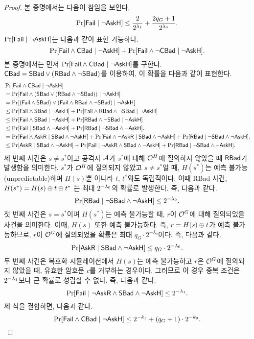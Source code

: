 \begin{proof}
	본 증명에서는 다음이 참임을 보인다.
	$$
		\Pr[\textsf{Fail} \mid \neg\textsf{AskH}] \le  \frac{2}{2^{\lambda_1}} + \frac{2q_{G} + 1}{2^{\lambda_0}}.
	$$
	$\Pr[\textsf{Fail} \mid \neg\textsf{AskH}]$는 다음과 같이 표현 가능하다.
	$$
		\Pr[\textsf{Fail} \land \textsf{CBad} \mid \neg\textsf{AskH}]
		+ \Pr[\textsf{Fail} \land \neg\textsf{CBad} \mid \neg\textsf{AskH}].
	$$
	본 증명에서는 먼저 $\Pr[\textsf{Fail} \land \textsf{CBad} \mid \neg\textsf{AskH}]$를 구한다. $\textsf{CBad}
	= \textsf{SBad} \lor (\textsf{RBad} \land \neg\textsf{SBad})$를 이용하여, 이 확률을 다음과 같이 표현한다.
	\begin{align*}
		&\Pr[\textsf{Fail} \land \textsf{CBad} \mid \neg\textsf{AskH}] \\
		&= \Pr[\textsf{Fail} \land (\textsf{SBad} \lor (\textsf{RBad} \land \neg\textsf{SBad})) \mid \neg\textsf{AskH}] \\
		&= \Pr[(\textsf{Fail} \land \textsf{SBad}) \lor (\textsf{Fail} \land \textsf{RBad} \land \neg\textsf{SBad}) \mid \neg\textsf{AskH}] \\
		&\le \Pr[\textsf{Fail} \land \textsf{SBad} \mid \neg\textsf{AskH}] + \Pr[\textsf{Fail} \land \textsf{RBad} \land \neg\textsf{SBad} \mid \neg\textsf{AskH}] \\
		&\le \Pr[\textsf{Fail} \land \textsf{SBad} \mid \neg\textsf{AskH}] + \Pr[\textsf{RBad} \land \neg\textsf{SBad} \mid \neg\textsf{AskH}] \\
		&\le \Pr[\textsf{Fail} \mid \textsf{SBad} \land \neg\textsf{AskH}] + \Pr[\textsf{RBad} \mid \neg\textsf{SBad} \land \neg\textsf{AskH}]. \\
		&= \Pr[\textsf{Fail} \land \textsf{AskR} \mid \textsf{SBad} \land \neg\textsf{AskH}] + \Pr[\textsf{Fail} \land \neg\textsf{AskR} \mid \textsf{SBad} \land \neg\textsf{AskH}] + \Pr[\textsf{RBad} \mid \neg\textsf{SBad} \land \neg\textsf{AskH}]. \\
		&\le \Pr[\textsf{AskR} \mid \textsf{SBad} \land \neg\textsf{AskH}] + \Pr[\textsf{Fail} \mid \neg\textsf{AskR} \land \textsf{SBad} \land \neg\textsf{AskH}] + \Pr[\textsf{RBad} \mid \neg\textsf{SBad} \land \neg\textsf{AskH}].
	\end{align*}
	세 번째 사건은 $s \ne s^*$이고 공격자 $\mathcal{A}$가 $s^*$에 대해
	$\mathcal{O}^{H}$에 질의하지 않았을 때 $\textsf{RBad}$가 발생함을 의미한다. $s^*$가
	$\mathcal{O}^H$에 질의되지 않았고 $s \ne s^*$일 때, $H(s^*)$는 예측
	불가능(unpredictable)하며 $H(s)$뿐 아니라 $t$, $t^*$와도 독립적이다.
	이때 RBad 사건, $H(s^*) = H(s) \oplus t \oplus t^*$ 는 최대
	$2^{-\lambda_0}$의 확률로 발생한다. 즉, 다음과 같다.
	$$
		\Pr[\textsf{RBad} \mid \neg\textsf{SBad} \land \neg\textsf{AskH}] \le 2^{-\lambda_0}.
	$$
	첫 번째 사건은 $s = s^*$이며 $H(s^*)$는 예측 불가능할 때, $r$이
	$\mathcal{O}^{G}$에 대해 질의되었을 사건을 의미한다. 이때, $H(s)$ 또한 예측
	불가능하다. 즉, $r = H(s) \oplus t$가 예측 불가능하므로, $r$이 $\mathcal{O}^G$에
	질의되었을 확률은 최대 $q_G \cdot 2^{-\lambda_0}$이다. 즉, 다음과 같다.
	$$
		\Pr[\textsf{AskR} \mid \textsf{SBad} \land \neg\textsf{AskH}] \le q_{G} \cdot 2^{-\lambda_0}.
	$$
	두 번째 사건은 복호화 시뮬레이션에서 $H(s)$는 예측 불가능하고 $r$은 $\mathcal{O}^G$에
	질의되지 않았을 때, 유효한 암호문 $c$를 거부하는 경우이다.  그러므로 이 경우 중복 조건은
	$2^{-\lambda_1}$보다 큰 확률로 성립할 수 없다. 즉, 다음과 같다.
	$$
		\Pr[\textsf{Fail} \mid \neg\textsf{AskR} \land \textsf{SBad} \land \neg\textsf{AskH}] \le 2^{-\lambda_1}.
	$$
	세 식을 결합하면, 다음과 같다.
	$$
		\Pr[\textsf{Fail} \land \textsf{CBad} \mid \neg\textsf{AskH}] \leq 2^{-k_1} + (q_G + 1) \cdot 2^{-k_0}.
	$$


\end{proof}
